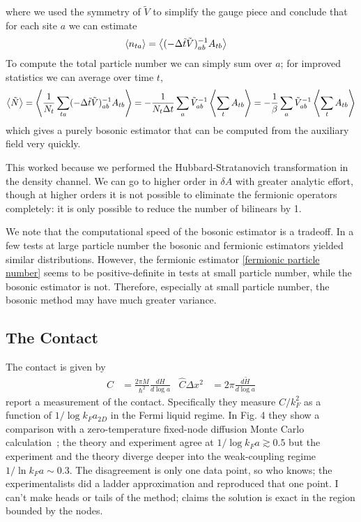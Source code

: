 where we used the symmetry of $\tilde{V}$ to simplify the gauge piece and conclude that for each site $a$ we can estimate
\begin{align}
	\left\langle n_{ta} \right\rangle &= \left\langle (-\Delta\tilde{t}\tilde{V})_{ab}^{-1} A_{tb} \right\rangle
\end{align}
To compute the total particle number we can simply sum over $a$; for improved statistics we can average over time $t$,
\begin{align}
	\left\langle \tilde{N} \right\rangle
	= \left\langle \frac{1}{N_t}\sum_{ta}(-\Delta\tilde{t}\tilde{V})_{ab}^{-1} A_{tb} \right\rangle
	= - \frac{1}{N_t \Delta t} \sum_a \tilde{V}_{ab}^{-1} \left\langle  \sum_t A_{tb} \right\rangle
	= - \frac{1}{\beta} \sum_a \tilde{V}_{ab}^{-1} \left\langle  \sum_t A_{tb} \right\rangle
	\label{eq:bosonic particle number}
\end{align}
which gives a purely bosonic estimator that can be computed from the auxiliary field very quickly.

This worked because we performed the Hubbard-Stratanovich transformation in the density channel.
We can go to higher order in $\delta A$ with greater analytic effort, though at higher orders it is not possible to eliminate the fermionic operators completely: it is only possible to reduce the number of bilinears by 1.

We note that the computational speed of the bosonic estimator is a tradeoff.
In a few tests at large particle number the bosonic and fermionic estimators yielded similar distributions.
However, the fermionic estimator \eqref{fermionic particle number} seems to be positive-definite in tests at small particle number, while the bosonic estimator is not.
Therefore, especially at small particle number, the bosonic method may have much greater variance.

\subsection{The Contact}\label{sec:contact}

The contact is given by~\cite{PhysRevA.86.013626}
\begin{align}
	\hat{C} &= \frac{2 \pi M}{\hbar^2} \frac{dH}{d\log a}
	&
	\hat{C}\Delta x^2 &= 2\pi \frac{d\tilde{H}}{d\log a} 
	\label{eq:contact}
\end{align}
 report a measurement of the contact.
Specifically they measure $C/k_F^2$ as a function of $1/\log k_F a_{2D}$ in the Fermi liquid regime.
In  Fig. 4 they show a comparison with a zero-temperature fixed-node diffusion Monte Carlo calculation~\cite{PhysRevLett.106.110403}; the theory and experiment agree at $1/\log k_F a \gtrsim 0.5$ but the experiment and the theory diverge deeper into the weak-coupling regime $1/\ln k_F a \sim 0.3$.
The disagreement is only one data point, so who knows; the experimentalists did a ladder approximation and reproduced that one point.
I can't make heads or tails of the method;  claims the solution is exact in the region bounded by the nodes.
